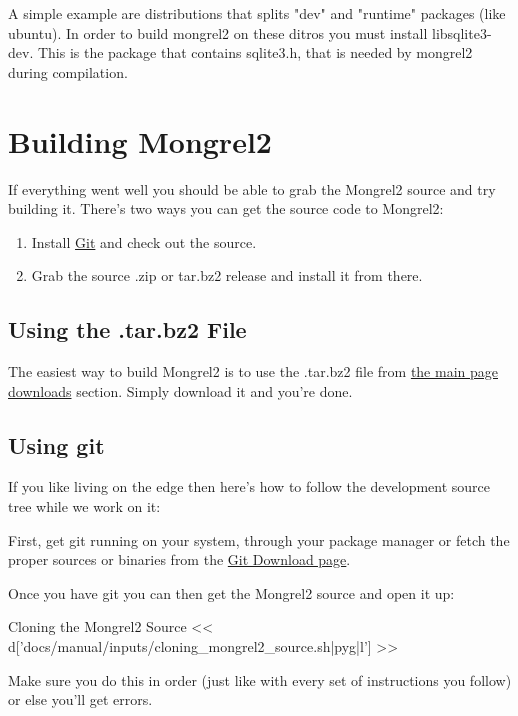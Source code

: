 A simple example are distributions that splits "dev" and "runtime" 
packages (like ubuntu). In order to build mongrel2 on these
ditros you must install libsqlite3-dev. This is the package that contains
sqlite3.h, that is needed by mongrel2 during compilation.

\section{Building Mongrel2}

If everything went well you should be able to grab the Mongrel2 source
and try building it.  There's two ways you can get the source code to
Mongrel2:

\begin{enumerate}
\item Install \href{http://git-scm.org}{Git} and check out the source.
\item Grab the source .zip or tar.bz2 release and install it from there.
\end{enumerate}

\subsection{Using the .tar.bz2 File}

The easiest way to build Mongrel2 is to use the .tar.bz2 file from 
\href{http://mongrel2.org/home#download}{the main page downloads} section.
Simply download it and you're done.


\subsection{Using git}

If you like living on the edge then here's how to follow the development source
tree while we work on it:

First, get git running on your system, through your package manager or fetch
the proper sources or binaries from the \href{http://git-scm.com/download}{Git Download page}.

Once you have git you can then get the Mongrel2 source and open it up:

\begin{code}{Cloning the Mongrel2 Source}
<< d['docs/manual/inputs/cloning_mongrel2_source.sh|pyg|l'] >>
\end{code}

Make sure you do this in order (just like with every set of instructions you follow)
or else you'll get errors.


